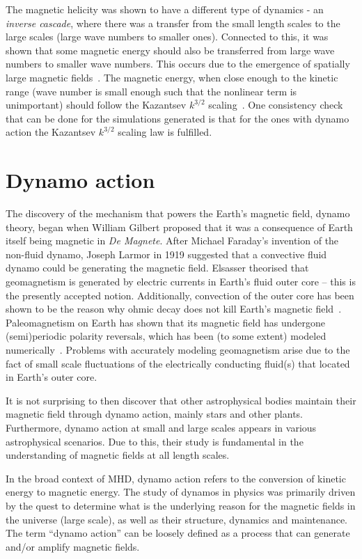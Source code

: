 \documentclass[12pt,a4paper]{report}
\begin{document}
The magnetic helicity was shown to have a different type of dynamics - an \textit{inverse cascade}, where there was a transfer from the small length scales to the large scales (large wave numbers to smaller ones). Connected to this, it was shown that some magnetic energy should also be transferred from large wave numbers to smaller wave numbers. This occurs due to the emergence of spatially large magnetic fields~\cite{LinkmannMoritzFrederikLeon2016Spim}. The magnetic energy, when close enough to the kinetic range (wave number is small enough such that the nonlinear term is unimportant) should follow the Kazantsev $k^{3/2}$ scaling~\cite{kazantsev1968enhancement, haugen2004simulations}. One consistency check that can be done for the simulations generated is that for the ones with dynamo action the Kazantsev $k^{3/2}$ scaling law is fulfilled.

\section{Dynamo action}

The discovery of the mechanism that powers the Earth's magnetic field, dynamo theory, began when William Gilbert proposed that it was a consequence of Earth itself being magnetic in \textit{De Magnete}. After Michael Faraday's invention of the non-fluid dynamo, Joseph Larmor in 1919 suggested that a convective fluid dynamo could be generating the magnetic field. Elsasser theorised that geomagnetism is generated by electric currents in Earth's fluid outer core -- this is the presently accepted notion. Additionally, convection of the outer core has been shown to be the reason why ohmic decay does not kill Earth's magnetic field~\cite{stern2002millennium}. Paleomagnetism on Earth has shown that its magnetic field has undergone (semi)periodic polarity reversals, which has been (to some extent) modeled numerically~\cite{glatzmaier1995three}. Problems with accurately modeling geomagnetism arise due to the fact of small scale fluctuations of the electrically conducting fluid(s) that located in Earth's outer core.

It is not surprising to then discover that other astrophysical bodies maintain their magnetic field through dynamo action, mainly stars and other plants. Furthermore, dynamo action at small and large scales appears in various astrophysical scenarios. Due to this, their study is fundamental in the understanding of magnetic fields at all length scales.

In the broad context of MHD, dynamo action refers to the conversion of kinetic energy to magnetic energy. The study of dynamos in physics was primarily driven by the quest to determine what is the underlying reason for the magnetic fields in the universe (large scale), as well as their structure, dynamics and maintenance. The term ``dynamo action'' can be loosely defined as a process that can generate and/or amplify magnetic fields. 
\end{document}
